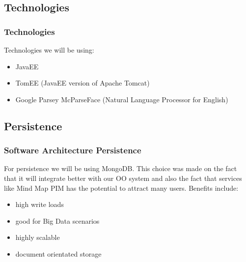 \documentclass{beamer}
\begin{document}
	\subsection{Technologies}
			\begin{frame}
			\frametitle{Technologies}
				Technologies we will be using:
				\begin{itemize}
					\item JavaEE
					\item TomEE (JavaEE version of Apache Tomcat)
					\item Google Parsey McParseFace (Natural Language Processor for English)
				\end{itemize}
			\end{frame}
			
		
	\subsection{Persistence}
		\begin{frame}
		\frametitle{Software Architecture Persistence}
			For persistence we will be using MongoDB. This choice was made on the fact that it will integrate better with our OO system and also the fact that services like Mind Map PIM has the potential to attract many users.
			Benefits include:
			\begin{itemize}
				\item high write loads
				\item good for Big Data scenarios
				\item highly scalable
				\item document orientated storage
			\end{itemize}
		\end{frame}
		
\end{document}
